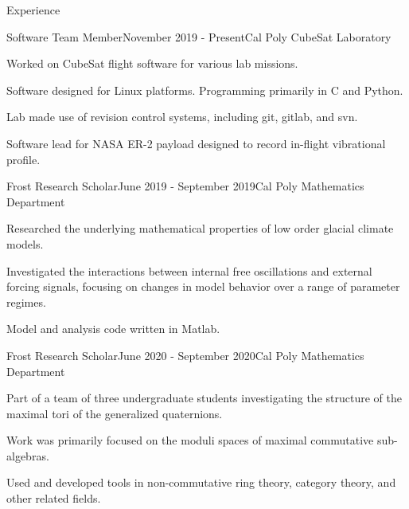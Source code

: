 \documentclass{resume} %
\begin{document}
\begin{rSection}{Experience}

\begin{rSubsection}{Software Team Member}{November 2019 - Present}{Cal Poly CubeSat Laboratory}{}
\item Worked on CubeSat flight software for various lab missions.
\item Software designed for Linux platforms. Programming primarily in C and Python.
\item Lab made use of revision control systems, including git, gitlab, and svn.
\item Software lead for NASA ER-2 payload designed to record in-flight vibrational profile.
\end{rSubsection}

\begin{rSubsection}{Frost Research Scholar}{June 2019 - September 2019}{Cal Poly Mathematics Department}{}
\item Researched the underlying mathematical properties of low order glacial climate models.
\item Investigated the interactions between internal free oscillations and external forcing signals, focusing on changes in model behavior over a range of parameter regimes.
\item Model and analysis code written in Matlab.
\end{rSubsection}

\begin{rSubsection}{Frost Research Scholar}{June 2020 - September 2020}{Cal Poly Mathematics Department}{}
\item Part of a team of three undergraduate students investigating the structure of the maximal tori of the generalized quaternions.
\item Work was primarily focused on the moduli spaces of maximal commutative sub-algebras.
\item Used and developed tools in non-commutative ring theory, category theory, and other related fields.
\end{rSubsection}

\end{rSection}
\end{document}
